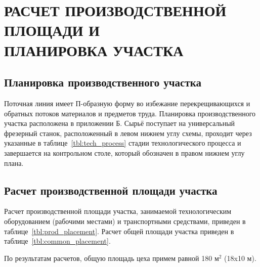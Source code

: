 \section[
Расчет производственной площади и планировка участка]{
РАСЧЕТ ПРОИЗВОДСТВЕННОЙ ПЛОЩАДИ И \\
ПЛАНИРОВКА УЧАСТКА
}
\label{sec:placement}

\subsection{Планировка производственного участка}

Поточная линия имеет П-образную форму во избежание перекрещивающихся и
обратных потоков материалов и предметов труда.
Планировка производственного участка расположена в приложении Б.
Сырьё поступает на универсальный фрезерный станок, 
расположенный в  левом нижнем углу схемы, 
проходит через указанные в таблице~\ref{tbl:tech_process} стадии
технологического процесса и завершается на контрольном столе,
который обозначен в правом нижнем углу плана.

\subsection{Расчет производственной площади участка}

Расчет производственной площади участка, занимаемой технологическим оборудованием
(рабочими местами) и транспортными средствами, 
приведен в таблице~\ref{tbl:prod_placement}.
Расчет общей площади участка приведен в таблице~\ref{tbl:common_placement}.

По результатам расчетов, общую площадь цеха примем равной
180 \( \text{м}^2 \) (18x10 м).

